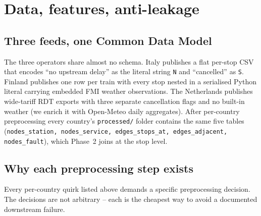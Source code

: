 \section{Data, features, anti-leakage}
\label{sec:data}

\subsection{Three feeds, one Common Data Model}

The three operators share almost no schema. Italy publishes a flat per-stop CSV that encodes ``no upstream delay'' as the literal string \texttt{N} and ``cancelled'' as \texttt{S}. Finland publishes one row per train with every stop nested in a serialised Python literal carrying embedded FMI weather observations. The Netherlands publishes wide-tariff RDT exports with three separate cancellation flags and no built-in weather (we enrich it with Open-Meteo daily aggregates). After per-country preprocessing every country's \texttt{processed/} folder contains the same five tables (\texttt{nodes\_station, nodes\_service, edges\_stops\_at, edges\_adjacent, nodes\_fault}), which Phase~2 joins at the stop level.

\subsection{Why each preprocessing step exists}
\label{sec:preprocessing-rationale}

Every per-country quirk listed above demands a specific preprocessing decision. The decisions are not arbitrary -- each is the cheapest way to avoid a documented downstream failure.

